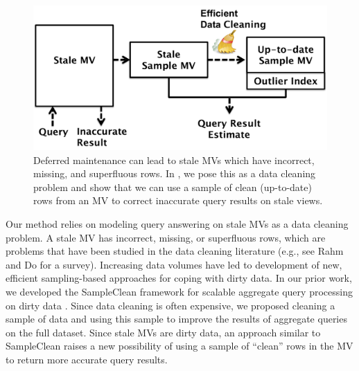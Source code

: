 
\begin{figure}[t] \vspace{-2em}
\centering
 \includegraphics[scale=0.25]{figs/sys-arch.pdf} \vspace{-.25em}
 \caption{Deferred maintenance can lead to stale MVs which have incorrect, missing, and superfluous rows. In \svc, we pose this as a data cleaning problem and show that we can use a sample of clean (up-to-date) rows from an MV to correct inaccurate query results on stale views.\label{sys-arch}}\vspace{-1.75em}
\end{figure}

Our method relies on modeling query answering on stale MVs as a data cleaning problem.
A stale MV has incorrect, missing, or superfluous rows, which are problems that have been studied in the data cleaning literature (e.g., see Rahm and Do for a survey\cite{rahm2000data}).
Increasing data volumes have led to development of new, efficient sampling-based approaches for coping with dirty data.   
In our prior work, we developed the SampleClean framework for scalable aggregate query processing on dirty data \cite{wang1999sample}.
Since data cleaning is often expensive, we proposed cleaning a sample of data and using this sample to improve the results of aggregate queries on the full dataset.
Since stale MVs are dirty data, an approach similar to SampleClean raises a new possibility of using a sample of ``clean'' rows in the MV to return more accurate query results.

